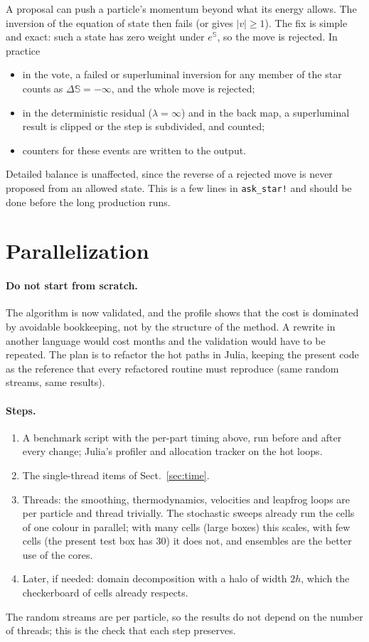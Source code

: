 \documentclass[11pt,aps,preprint,nofootinbib,superscriptaddress,tightenlines]{revtex4-2}
\def\Sect#1{Sect.~\ref{#1}}
\let\oldparagraph\paragraph
\renewcommand{\paragraph}{\par\bigskip\oldparagraph}
\begin{document}
A proposal can push a particle's momentum beyond what its energy allows.  The
inversion of the equation of state then fails (or gives $|v|\geq1$).  The
fix is simple and exact: such a state has zero weight under $e^{\mathbb S}$, so
the move is rejected.  In practice
\begin{itemize}
\item in the vote, a failed or superluminal inversion for any member of the
  star counts as $\Delta\mathbb S=-\infty$, and the whole move is rejected;
\item in the deterministic residual ($\lambda=\infty$) and in the back map, a
  superluminal result is clipped or the step is subdivided, and counted;
\item counters for these events are written to the output.
\end{itemize}
Detailed balance is unaffected, since the reverse of a rejected move is never
proposed from an allowed state.  This is a few lines in \texttt{ask\_star!} and
should be done before the long production runs.

\section{Parallelization}
\label{sec:parallel}

\paragraph{Do not start from scratch.}  The algorithm is now validated, and
the profile shows that the cost is dominated by avoidable bookkeeping, not by
the structure of the method.  A rewrite in another language would cost months
and the validation would have to be repeated.  The plan is to refactor the
hot paths in Julia, keeping the present code as the reference that every
refactored routine must reproduce (same random streams, same results).

\paragraph{Steps.}
\begin{enumerate}
\item A benchmark script with the per-part timing above, run before and after
  every change; Julia's profiler and allocation tracker on the hot loops.
\item The single-thread items of \Sect{sec:time}.
\item Threads: the smoothing, thermodynamics, velocities and leapfrog loops
  are per particle and thread trivially.  The stochastic sweeps already run the
  cells of one colour in parallel; with many cells (large boxes) this scales,
  with few cells (the present test box has 30) it does not, and ensembles are
  the better use of the cores.
\item Later, if needed: domain decomposition with a halo of width $2h$, which the
  checkerboard of cells already respects.
\end{enumerate}
The random streams are per particle, so the results do not depend on the
number of threads; this is the check that each step preserves.
\end{document}
